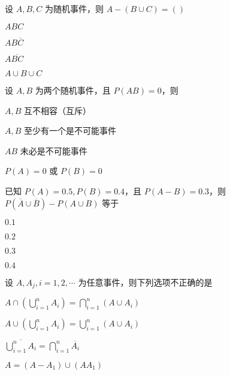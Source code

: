 \documentclass{exam-zh}
\begin{document}
\begin{question}
  设 $A, B, C$ 为随机事件，则  
  $A - (B \cup C) = ( )$ \paren[C]
  \begin{choices}
    \item $ABC$  
    \item $AB\overline{C}$  
    \item $A\overline{BC}$  
    \item $A \cup B \cup C$  
  \end{choices}
\end{question}

\begin{question}
  设 $A, B$ 为两个随机事件，且 $P(AB) = 0$，则 \paren[C]
  \begin{choices}
    \item $A, B$ 互不相容（互斥）
    \item $A, B$ 至少有一个是不可能事件
    \item $AB$ 未必是不可能事件
    \item $P(A) = 0$ 或 $P(B) = 0$
  \end{choices}
\end{question}

\begin{question}
  已知 $P(A)=0.5, P(B)=0.4$，且 $P(A-B)=0.3$，则  
  $P(\overline{A} \cup \overline{B}) - P(A \cup B)$ 等于 \paren[A]
  \begin{choices}
    \item $0.1$  
    \item $0.2$  
    \item $0.3$  
    \item $0.4$  
  \end{choices}
\end{question}

\begin{question}
  设 $A, A_j, i = 1, 2, \cdots$ 为任意事件，则下列选项不正确的是 \paren[A]
  \begin{choices}
    \item $A \cap \left( \bigcup_{i=1}^n A_i \right) = \bigcap_{i=1}^n (A \cup A_i)$
    \item $A \cup \left( \bigcup_{i=1}^n A_i \right) = \bigcup_{i=1}^n (A \cup A_i)$ 
    \item $\overline{\bigcup_{i=1}^n A_i} = \bigcap_{i=1}^n \overline{A_i}$
    \item $A = (A - A_1) \cup (AA_1)$
  \end{choices}
\end{question}
\end{document}
